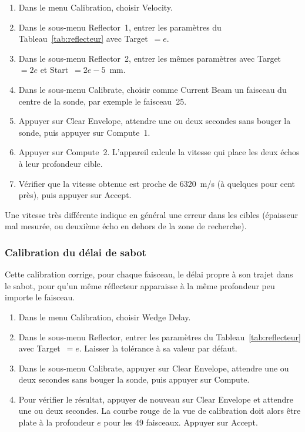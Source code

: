 \documentclass[11pt,letterpaper]{article}
\begin{document}
\begin{enumerate}
  \item Dans le menu Calibration, choisir Velocity.
  \item Dans le sous-menu Reflector~1, entrer les param\`etres du Tableau~\ref{tab:reflecteur} avec Target~$= e$.
  \item Dans le sous-menu Reflector~2, entrer les m\^emes param\`etres avec Target~$= 2e$ et Start~$= 2e - 5$~mm.
  \item Dans le sous-menu Calibrate, choisir comme Current Beam un faisceau du centre de la sonde, par exemple le faisceau~25.
  \item Appuyer sur Clear Envelope, attendre une ou deux secondes sans bouger la sonde, puis appuyer sur Compute~1.
  \item Appuyer sur Compute~2. L'appareil calcule la vitesse qui place les deux \'echos \`a leur profondeur cible.
  \item V\'erifier que la vitesse obtenue est proche de 6320~m/s (\`a quelques pour cent pr\`es), puis appuyer sur Accept.
\end{enumerate}

Une vitesse tr\`es diff\'erente indique en g\'en\'eral une erreur dans les cibles (\'epaisseur mal mesur\'ee, ou deuxi\`eme \'echo en dehors de la zone de recherche).

\subsubsection*{Calibration du d\'elai de sabot}

Cette calibration corrige, pour chaque faisceau, le d\'elai propre \`a son trajet dans le sabot, pour qu'un m\^eme r\'eflecteur apparaisse \`a la m\^eme profondeur peu importe le faisceau.

\begin{enumerate}
  \item Dans le menu Calibration, choisir Wedge Delay.
  \item Dans le sous-menu Reflector, entrer les param\`etres du Tableau~\ref{tab:reflecteur} avec Target~$= e$. Laisser la tol\'erance \`a sa valeur par d\'efaut.
  \item Dans le sous-menu Calibrate, appuyer sur Clear Envelope, attendre une ou deux secondes sans bouger la sonde, puis appuyer sur Compute.
  \item Pour v\'erifier le r\'esultat, appuyer de nouveau sur Clear Envelope et attendre une ou deux secondes. La courbe rouge de la vue de calibration doit alors \^etre plate \`a la profondeur $e$ pour les 49 faisceaux. Appuyer sur Accept.
\end{enumerate}
\end{document}
